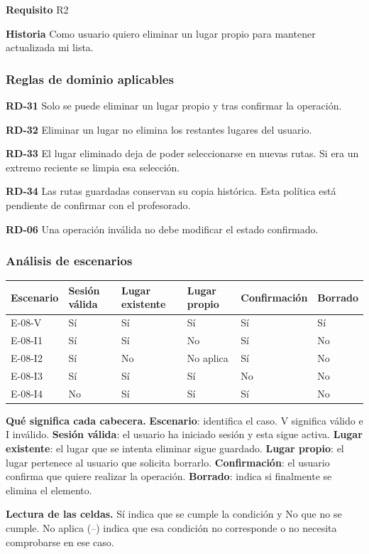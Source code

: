 \textbf{Requisito} R2\par

\textbf{Historia} Como usuario quiero eliminar un lugar propio para mantener actualizada mi lista.\par

\subsubsection*{Reglas de dominio aplicables}

\textbf{RD-31} Solo se puede eliminar un lugar propio y tras confirmar la operación.\par

\textbf{RD-32} Eliminar un lugar no elimina los restantes lugares del usuario.\par

\textbf{RD-33} El lugar eliminado deja de poder seleccionarse en nuevas rutas. Si era un extremo reciente se limpia esa selección.\par

\textbf{RD-34} Las rutas guardadas conservan su copia histórica. Esta política está pendiente de confirmar con el profesorado.\par

\textbf{RD-06} Una operación inválida no debe modificar el estado confirmado.\par

\subsubsection*{Análisis de escenarios}

\begingroup\fontsize{7.8}{11}\selectfont\setlength{\tabcolsep}{3pt}
\begin{tabularx}{\linewidth}{@{}*{6}{Y}@{}}\toprule
\textbf{Escenario} & \textbf{Sesión válida} & \textbf{Lugar existente} & \textbf{Lugar propio} & \textbf{Confirmación} & \textbf{Borrado}\\\midrule
E-08-V & Sí & Sí & Sí & Sí & Sí\\[3pt]
E-08-I1 & Sí & Sí & No & Sí & No\\[3pt]
E-08-I2 & Sí & No & No aplica & Sí & No\\[3pt]
E-08-I3 & Sí & Sí & Sí & No & No\\[3pt]
E-08-I4 & No & Sí & Sí & Sí & No\\[3pt]
\bottomrule\end{tabularx}\endgroup\par
{\fontsize{9}{11}\selectfont\textbf{Qué significa cada cabecera.} \textbf{Escenario}: identifica el caso. V significa válido e I inválido. \textbf{Sesión válida}: el usuario ha iniciado sesión y esta sigue activa. \textbf{Lugar existente}: el lugar que se intenta eliminar sigue guardado. \textbf{Lugar propio}: el lugar pertenece al usuario que solicita borrarlo. \textbf{Confirmación}: el usuario confirma que quiere realizar la operación. \textbf{Borrado}: indica si finalmente se elimina el elemento.\par\textbf{Lectura de las celdas.} Sí indica que se cumple la condición y No que no se cumple. No aplica (--) indica que esa condición no corresponde o no necesita comprobarse en ese caso.\par}


